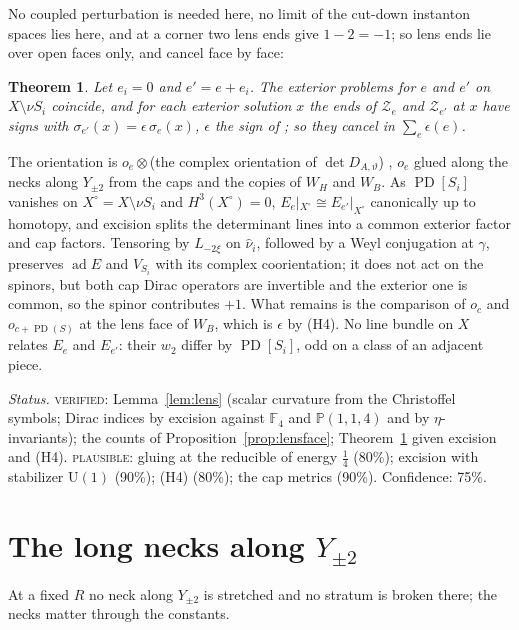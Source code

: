 \documentclass[10pt]{amsart}
\makeatletter
\numberwithin{equation}{section}
\theoremstyle{compact}
\newtheorem{theorem}{Theorem}[section]
\renewenvironment{proof}[1][\proofname]{\par\pushQED{\qed}\normalfont
  \topsep4\p@\relax\trivlist\item[\hskip\labelsep\itshape#1\@addpunct{.}]%
  \ignorespaces}{\popQED\endtrivlist\@endpefalse}
\newcommand{\PD}{\operatorname{PD}}
\newcommand{\cZ}{\mathcal Z}
\newcommand{\step}[1]{\par\noindent\textit{#1}\enspace}
\newcommand{\ver}{\textsc{verified}}
\newcommand{\pla}{\textsc{plausible}}
\makeatother
\begin{document}
No coupled perturbation is needed here, no limit of the cut-down instanton
spaces lies here, and at a corner two lens ends give $1-2=-1$; so lens ends lie
over open faces only, and cancel face by face:

\begin{theorem}\label{thm:cancel}
Let $e_i=0$ and $e'=e+e_i$. The exterior problems for $e$ and $e'$ on
$X\setminus\nu S_i$ coincide, and for each exterior solution $x$ the ends of
$\cZ_e$ and $\cZ_{e'}$ at $x$ have signs with $\sigma_{e'}(x)=\epsilon\,
\sigma_e(x)$, $\epsilon$ the sign of \cite[Thm.~1.1]{FS}; so they cancel in
$\sum_e\epsilon(e)$.
\end{theorem}

\begin{proof}[Sketch]
The orientation is $o_e\otimes$(the complex orientation of $\det
D_{A,\vartheta}$) \cite[Def.~2.3, (2.5)]{FL2b}, $o_e$ glued along the necks
along $Y_{\pm2}$ from the caps and the copies of $W_H$ and $W_B$. As $\PD[S_i]$
vanishes on $X^\circ=X\setminus\nu S_i$ and $H^3(X^\circ)=0$,
$E_e|_{X^\circ}\cong E_{e'}|_{X^\circ}$ canonically up to homotopy, and excision
splits the determinant lines into a common exterior factor and cap factors.
Tensoring by $L_{-2\xi}$ on $\hat\nu_i$, followed by a Weyl conjugation at
$\gamma$, preserves $\operatorname{ad}E$ and $V_{S_i}$ with its complex
coorientation; it does not act on the spinors, but both cap Dirac operators are
invertible and the exterior one is common, so the spinor contributes $+1$. What
remains is the comparison of $o_c$ and $o_{c+\PD(S)}$ at the lens face of $W_B$,
which is $\epsilon$ by (H4). No line bundle on $X$ relates $E_e$ and $E_{e'}$:
their $w_2$ differ by $\PD[S_i]$, odd on a class of an adjacent piece.
\end{proof}

\step{Status.} \ver: Lemma~\ref{lem:lens} (scalar curvature from the
Christoffel symbols; Dirac indices by excision against $\mathbb F_4$ and
$\mathbb P(1,1,4)$ and by $\eta$-invariants); the counts of
Proposition~\ref{prop:lensface}; Theorem~\ref{thm:cancel} given excision and
(H4). \pla: gluing at the reducible of energy $\frac14$ (80\%); excision with
stabilizer $\mathrm U(1)$ (90\%); (H4) (80\%); the cap metrics (90\%).
Confidence: 75\%.

\section{The long necks along $Y_{\pm2}$}

At a fixed $R$ no neck along $Y_{\pm2}$ is stretched and no stratum is broken
there; the necks matter through the constants.
\end{document}

